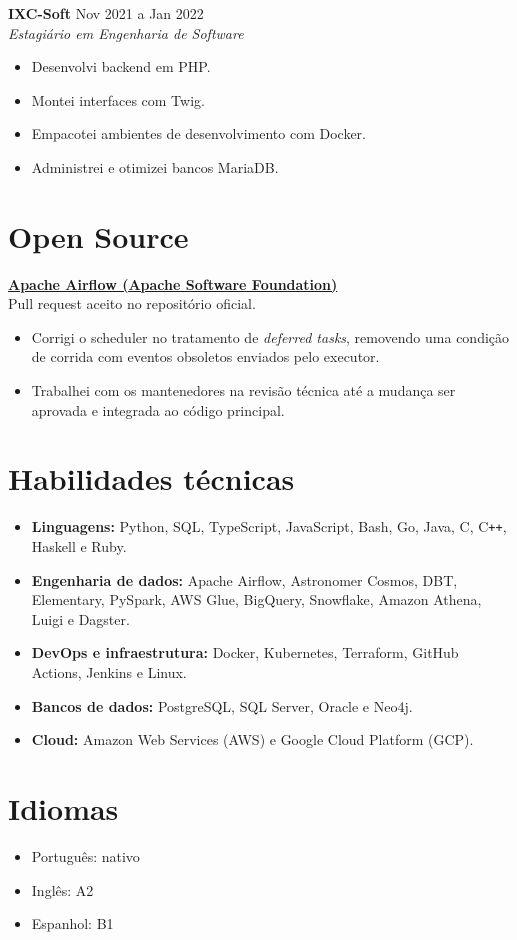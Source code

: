 \documentclass[a4paper,10pt]{article}
\begin{document}
\textbf{IXC-Soft} \hfill Nov 2021 a Jan 2022 \\
\textit{Estagiário em Engenharia de Software}
\begin{itemize}
    \item Desenvolvi backend em PHP.
    \item Montei interfaces com Twig.
    \item Empacotei ambientes de desenvolvimento com Docker.
    \item Administrei e otimizei bancos MariaDB.
\end{itemize}

\section*{Open Source}

\textbf{\href{https://github.com/apache/airflow/pull/66431}{Apache Airflow (Apache Software Foundation)}} \\
Pull request aceito no repositório oficial.
\begin{itemize}
    \item Corrigi o scheduler no tratamento de \textit{deferred tasks}, removendo uma condição de corrida com eventos obsoletos enviados pelo executor.
    \item Trabalhei com os mantenedores na revisão técnica até a mudança ser aprovada e integrada ao código principal.
\end{itemize}

\section*{Habilidades técnicas}

\begin{itemize}
    \item \textbf{Linguagens:} Python, SQL, TypeScript, JavaScript, Bash, Go, Java, C, C\texttt{++}, Haskell e Ruby.
    \item \textbf{Engenharia de dados:} Apache Airflow, Astronomer Cosmos, DBT, Elementary, PySpark, AWS Glue, BigQuery, Snowflake, Amazon Athena, Luigi e Dagster.
    \item \textbf{DevOps e infraestrutura:} Docker, Kubernetes, Terraform, GitHub Actions, Jenkins e Linux.
    \item \textbf{Bancos de dados:} PostgreSQL, SQL Server, Oracle e Neo4j.
    \item \textbf{Cloud:} Amazon Web Services (AWS) e Google Cloud Platform (GCP).
\end{itemize}

\section*{Idiomas}

\begin{itemize}
    \item Português: nativo
    \item Inglês: A2
    \item Espanhol: B1
\end{itemize}
\end{document}
